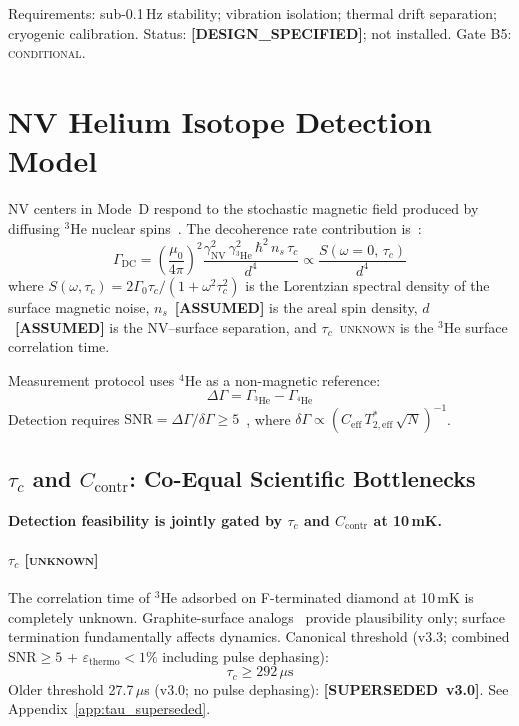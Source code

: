 \documentclass[12pt,a4paper]{article}
\newcommand{\conditional}{\textsc{conditional}}
\newcommand{\unknown}{\textsc{unknown}}
\newcommand{\assumed}{\textbf{[ASSUMED]}}
\newcommand{\designspec}{\textbf{[DESIGN\_SPECIFIED]}}
\newcommand{\superseded}{\textbf{[SUPERSEDED~v3.0]}}
\begin{document}
Requirements: sub-0.1\,Hz stability; vibration isolation; thermal drift separation;
cryogenic calibration.
Status: \designspec{}; not installed.
Gate B5: \conditional{}.

\section{NV Helium Isotope Detection Model}
\label{sec:detection}

NV centers in Mode~D respond to the stochastic magnetic field produced by
diffusing $^3$He nuclear spins~\cite{KolkowitzScience2015,MazeNature2008}.
The decoherence rate contribution is~\cite{DegenRMP2017}:
\begin{equation}
  \Gamma_\mathrm{DC} = \left(\frac{\mu_0}{4\pi}\right)^2
  \frac{\gamma_\mathrm{NV}^2\,\gamma_{^3\mathrm{He}}^2\,\hbar^2\,n_s\,\tau_c}{d^4}
  \propto \frac{S(\omega{=}0,\,\tau_c)}{d^4}
\end{equation}
where $S(\omega,\tau_c) = 2\Gamma_0\tau_c/(1+\omega^2\tau_c^2)$ is the Lorentzian
spectral density of the surface magnetic noise,
$n_s$~\assumed{} is the areal spin density,
$d$~\assumed{} is the NV--surface separation, and
$\tau_c$~\unknown{} is the $^3$He surface correlation time.

Measurement protocol uses $^4$He as a non-magnetic reference:
\begin{equation}
  \Delta\Gamma = \Gamma_{^3\mathrm{He}} - \Gamma_{^4\mathrm{He}}
\end{equation}
Detection requires $\mathrm{SNR} = \Delta\Gamma / \delta\Gamma \geq 5$~\cite{TaylorNatPhys2008},
where $\delta\Gamma \propto (C_\mathrm{eff}\,T_{2,\mathrm{eff}}^*\,\sqrt{N})^{-1}$.

\subsection{$\tau_c$ and $C_\mathrm{contr}$: Co-Equal Scientific Bottlenecks}

\textbf{Detection feasibility is jointly gated by $\tau_c$ and $C_\mathrm{contr}$
at 10\,mK.}

\paragraph{$\tau_c$ [\unknown{}]}
The correlation time of $^3$He adsorbed on F-terminated diamond at 10\,mK is
completely unknown.
Graphite-surface analogs~\cite{Bernu2006,MorhardPRB1996,Greywall1993} provide
plausibility only; surface termination fundamentally affects dynamics.
Canonical threshold (v3.3; combined SNR$\geq5$ + $\varepsilon_\mathrm{thermo}<1\%$
including pulse dephasing):
\begin{equation}
  \tau_c \geq 292\,\mu\mathrm{s}
\end{equation}
Older threshold 27.7\,$\mu$s (v3.0; no pulse dephasing): \superseded{}.
See Appendix~\ref{app:tau_superseded}.
\end{document}
